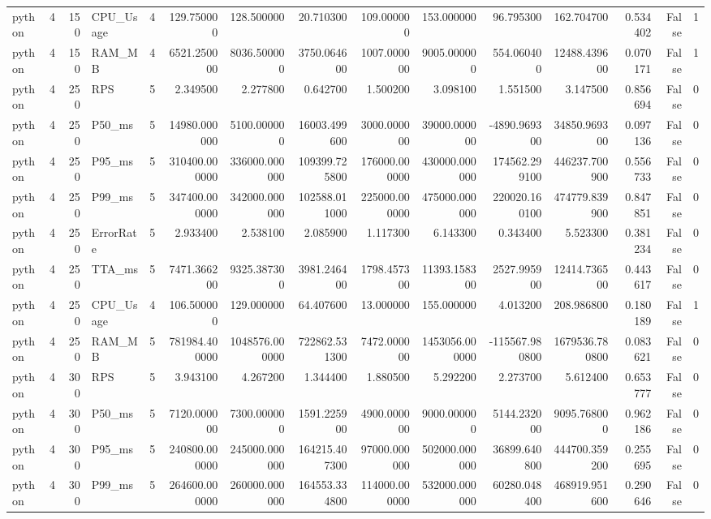 \begin{tabular}{lrrlrrrrrrrrrrr}
python & 4 & 150 & CPU_Usage & 4 & 129.750000 & 128.500000 & 20.710300 & 109.000000 & 153.000000 & 96.795300 & 162.704700 & 0.534402 & False & 1 \\
python & 4 & 150 & RAM_MB & 4 & 6521.250000 & 8036.500000 & 3750.064600 & 1007.000000 & 9005.000000 & 554.060400 & 12488.439600 & 0.070171 & False & 1 \\
python & 4 & 250 & RPS & 5 & 2.349500 & 2.277800 & 0.642700 & 1.500200 & 3.098100 & 1.551500 & 3.147500 & 0.856694 & False & 0 \\
python & 4 & 250 & P50_ms & 5 & 14980.000000 & 5100.000000 & 16003.499600 & 3000.000000 & 39000.000000 & -4890.969300 & 34850.969300 & 0.097136 & False & 0 \\
python & 4 & 250 & P95_ms & 5 & 310400.000000 & 336000.000000 & 109399.725800 & 176000.000000 & 430000.000000 & 174562.299100 & 446237.700900 & 0.556733 & False & 0 \\
python & 4 & 250 & P99_ms & 5 & 347400.000000 & 342000.000000 & 102588.011000 & 225000.000000 & 475000.000000 & 220020.160100 & 474779.839900 & 0.847851 & False & 0 \\
python & 4 & 250 & ErrorRate & 5 & 2.933400 & 2.538100 & 2.085900 & 1.117300 & 6.143300 & 0.343400 & 5.523300 & 0.381234 & False & 0 \\
python & 4 & 250 & TTA_ms & 5 & 7471.366200 & 9325.387300 & 3981.246400 & 1798.457300 & 11393.158300 & 2527.995900 & 12414.736500 & 0.443617 & False & 0 \\
python & 4 & 250 & CPU_Usage & 4 & 106.500000 & 129.000000 & 64.407600 & 13.000000 & 155.000000 & 4.013200 & 208.986800 & 0.180189 & False & 1 \\
python & 4 & 250 & RAM_MB & 5 & 781984.400000 & 1048576.000000 & 722862.531300 & 7472.000000 & 1453056.000000 & -115567.980800 & 1679536.780800 & 0.083621 & False & 0 \\
python & 4 & 300 & RPS & 5 & 3.943100 & 4.267200 & 1.344400 & 1.880500 & 5.292200 & 2.273700 & 5.612400 & 0.653777 & False & 0 \\
python & 4 & 300 & P50_ms & 5 & 7120.000000 & 7300.000000 & 1591.225900 & 4900.000000 & 9000.000000 & 5144.232000 & 9095.768000 & 0.962186 & False & 0 \\
python & 4 & 300 & P95_ms & 5 & 240800.000000 & 245000.000000 & 164215.407300 & 97000.000000 & 502000.000000 & 36899.640800 & 444700.359200 & 0.255695 & False & 0 \\
python & 4 & 300 & P99_ms & 5 & 264600.000000 & 260000.000000 & 164553.334800 & 114000.000000 & 532000.000000 & 60280.048400 & 468919.951600 & 0.290646 & False & 0 \\

\end{tabular}

